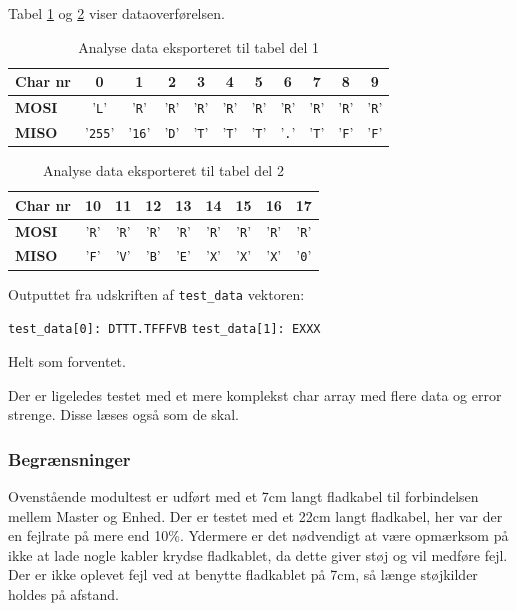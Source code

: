 Tabel \ref{table:scop_getlog1} og \ref{table:scop_getlog2} viser dataoverførelsen. 

\begin{table}[H]
	\caption{Analyse data eksporteret til tabel del 1}
	\centering
	\begin{tabular}{|l|c|c|c|c|c|c|c|c|c|c|}
		\hline 
		\textbf{Char nr} & \textbf{0} & \textbf{1} & \textbf{2} & \textbf{3} & \textbf{4} & \textbf{5} 
						 & \textbf{6} & \textbf{7} & \textbf{8} & \textbf{9}\\ 		
		\hline 
		\textbf{MOSI} & '\verb+L+' & '\verb+R+' & '\verb+R+' & '\verb+R+' & '\verb+R+' & '\verb+R+' 
						& '\verb+R+' & '\verb+R+' & '\verb+R+' & '\verb+R+'\\ 
		\hline 
		\textbf{MISO} & '\verb+255+' & '\verb+16+' & '\verb+D+' & '\verb+T+' & '\verb+T+' & '\verb+T+' 
						& '\verb+.+' & '\verb+T+' & '\verb+F+' & '\verb+F+'\\
						 
		\hline 
	\end{tabular} 
	\label{table:scop_getlog1}
\end{table}


\begin{table}[H]
	\caption{Analyse data eksporteret til tabel del 2}
	\centering
	\begin{tabular}{|l|c|c|c|c|c|c|c|c|}
		\hline 
		\textbf{Char nr} & \textbf{10} & \textbf{11} & \textbf{12} & \textbf{13}
						& \textbf{14} & \textbf{15} & \textbf{16} & \textbf{17}\\ 		
		\hline 
		\textbf{MOSI} 	& '\verb+R+' & '\verb+R+' & '\verb+R+' & '\verb+R+'
						& '\verb+R+' & '\verb+R+' & '\verb+R+' & '\verb+R+' \\ 
		\hline 
		\textbf{MISO}	& '\verb+F+' & '\verb+V+' & '\verb+B+' & '\verb+E+'
						& '\verb+X+' & '\verb+X+' & '\verb+X+' & '\verb+0+'\\
						 
		\hline 
	\end{tabular} 
	\label{table:scop_getlog2}
\end{table}

Outputtet fra udskriften af \verb+test_data+ vektoren:

\verb+test_data[0]: DTTT.TFFFVB+ \newline
\verb+test_data[1]: EXXX+

Helt som forventet.

Der er ligeledes testet med et mere komplekst char array med flere data og error strenge. Disse læses også som de skal. 

\subsubsection*{Begrænsninger}

Ovenstående modultest er udført med et 7cm langt fladkabel til forbindelsen mellem Master og Enhed. Der er testet med et 22cm langt fladkabel, her var der en fejlrate på mere end 10\%. Ydermere er det nødvendigt at være opmærksom på ikke at lade nogle kabler krydse fladkablet, da dette giver støj og vil medføre fejl. Der er ikke oplevet fejl ved at benytte fladkablet på 7cm, så længe støjkilder holdes på afstand.   
